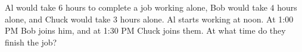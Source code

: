 Al would take $6$ hours to complete a job working alone, Bob would take $4$ hours alone, and Chuck would take $3$ hours alone. Al starts working at noon. At 1:00 PM Bob joins him, and at 1:30 PM Chuck joins them. At what time do they finish the job?
